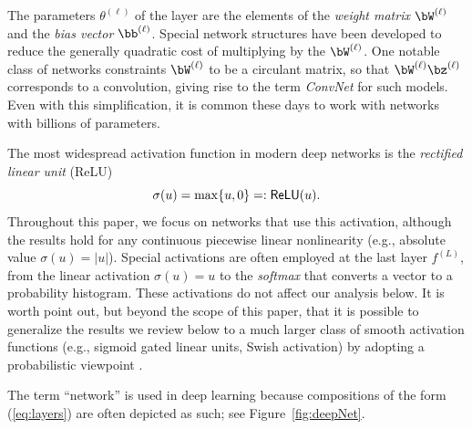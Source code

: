 \documentclass{notices}
\begin{document}
The parameters $\theta^{(\ell)}$ of the layer are the elements of the {\em weight matrix} $\bW^{(\ell)}$ and the {\em bias vector} $\bb^{(\ell)}$.
Special network structures have been developed to reduce the generally quadratic cost of multiplying by the $\bW^{(\ell)}$. 
One notable class of networks constraints $\bW^{(\ell)}$ to be a circulant matrix, so that $\bW^{(\ell)}\bz^{(\ell)}$ corresponds to a convolution, giving rise to the term {\em ConvNet} for such models.
Even with this simplification, it is common these days to work with networks with billions of parameters.


The most widespread activation function in modern deep
networks is the {\em rectified linear unit} (ReLU)
\begin{equation}
\sigma(u) = \max\{ u, 0 \} =: {\sf ReLU}(u).
\label{eq:ReLU}
\end{equation}
Throughout this paper, we focus on networks that use this activation,
although the results hold for any continuous piecewise linear nonlinearity (e.g., absolute value $\sigma(u)=|u|$).
Special activations are often employed at the last layer $f^{(L)}$, from the linear activation $\sigma(u)=u$ to the {\em softmax} that converts a vector to a probability histogram.
These activations do not affect our analysis below.
It is worth point out, but beyond the scope of this paper, that it is possible to generalize the results we review below to a much larger class of smooth activation functions (e.g., sigmoid gated linear units, Swish activation) by adopting a probabilistic viewpoint \cite{balestriero2018hard}.


The term ``network'' is used in
deep learning because compositions of the form (\ref{eq:layers}) are often depicted as such; see Figure~\ref{fig:deepNet}.
\end{document}
